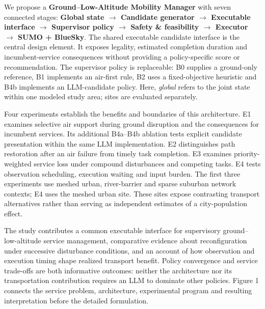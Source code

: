 \documentclass[]{interact}
\theoremstyle{plain}
\theoremstyle{definition}
\theoremstyle{remark}
\begin{document}
We propose a \textbf{Ground--Low-Altitude Mobility Manager} with seven connected stages: \textbf{Global state $\rightarrow$ Candidate generator $\rightarrow$ Executable interface $\rightarrow$ Supervisor policy $\rightarrow$ Safety \& feasibility $\rightarrow$ Executor $\rightarrow$ SUMO + BlueSky}. The shared executable candidate interface is the central design element. It exposes legality, estimated completion duration and incumbent-service consequences without providing a policy-specific score or recommendation. The supervisor policy is replaceable: B0 supplies a ground-only reference, B1 implements an air-first rule, B2 uses a fixed-objective heuristic and B4b implements an LLM-candidate policy. Here, \emph{global} refers to the joint state within one modeled study area; sites are evaluated separately.

Four experiments establish the benefits and boundaries of this architecture. E1 examines selective air support during ground disruption and the consequences for incumbent services. Its additional B4a--B4b ablation tests explicit candidate presentation within the same LLM implementation. E2 distinguishes path restoration after an air failure from timely task completion. E3 examines priority-weighted service loss under compound disturbances and competing tasks. E4 tests observation scheduling, execution waiting and input burden. The first three experiments use meshed urban, river-barrier and sparse suburban network contexts; E4 uses the meshed urban site. These sites expose contrasting transport alternatives rather than serving as independent estimates of a city-population effect.

The study contributes a common executable interface for supervisory ground--low-altitude service management, comparative evidence about reconfiguration under successive disturbance conditions, and an account of how observation and execution timing shape realized transport benefit. Policy convergence and service trade-offs are both informative outcomes: neither the architecture nor its transportation contribution requires an LLM to dominate other policies. Figure 1 connects the service problem, architecture, experimental program and resulting interpretation before the detailed formulation.
\end{document}
